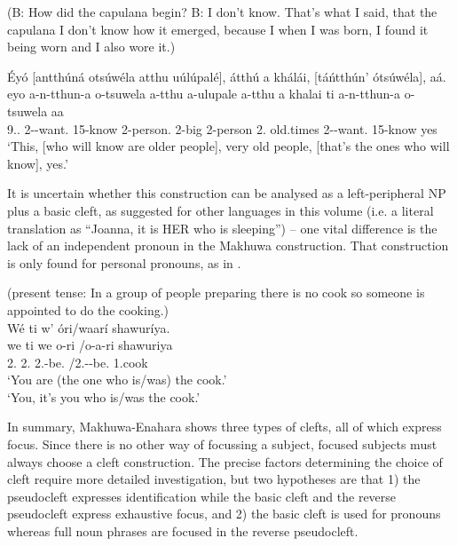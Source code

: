 \documentclass[output=paper]{langscibook}
\begin{document}
\ea
\label{bkm:Ref117584314}
(B: How did the capulana begin? B: I don’t know. That’s what I said, that the capulana I don’t know how it emerged, because I when I was born, I found it being worn and I also wore it.)\\
\begin{xlist}
Éyó [antthúná otsúwéla atthu uúlúpalé], átthú a khálái, [táńtthún’ ótsúwéla], aá.\\
\gll
eyo  a-n-tthun-a  o-tsuwela  a-tthu  a-ulupale    a-tthu  a  khalai  ti  a-n-tthun-a  o-tsuwela  aa  \\
9.\DEM{}.\MED{}  2-\PRS{}-want.\REL{}  15-know  2-person.\PRL{}  2-big  2-person  2.\CONN{}  old.times  \COP{}  2-\PRS{}-want.\REL{}  15-know  yes \\
\glt
‘This, [who will know are older people], very old people, [that’s the ones who will know], yes.’\\
\end{xlist}

\z


It is uncertain whether this construction can be analysed as a left-peripheral NP plus a basic cleft, as suggested for other languages in this volume (i.e. a literal translation as “Joanna, it is HER who is sleeping”) – one vital difference is the lack of an independent pronoun in the Makhuwa construction. That construction is only found for personal pronouns, as in .\largerpage[-1]\pagebreak

\ea
\label{bkm:Ref115120262}
(present tense: In a group of people preparing there is no cook so someone is appointed to do the cooking.)\\
Wé ti w’ óri/waarí shawuríya.\\
\gll
we  ti  we  o-ri  /o-a-ri  shawuriya\\
2\SG{}.\PRO{}  \COP{}  2\SG{}.\PRO{}  2\SG{}.\SM{}-be.\REL{}  /2\SG{}.\SM{}-\PST{}-be.\REL{}  1.cook\\
\glt
‘You are (the one who is/was) the cook.’\\
‘You, it’s you who is/was the cook.’


\z

In summary, Makhuwa-Enahara shows three types of clefts, all of which express focus. Since there is no other way of focussing a subject, focused subjects must always choose a cleft construction. The precise factors determining the choice of cleft require more detailed investigation, but two hypotheses are that 1) the pseudocleft expresses identification while the basic cleft and the reverse pseudocleft express exhaustive focus, and 2) the basic cleft is used for pronouns whereas full noun phrases are focused in the reverse pseudocleft.
\end{document}
